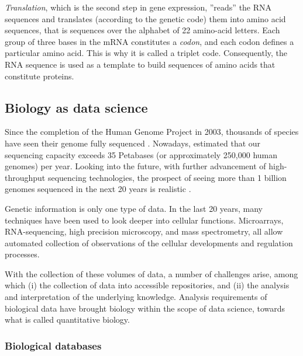 \emph{Translation}, which is the second step in gene expression, ''reads'' the RNA sequences and translates (according to the genetic code) them into amino acid sequences, that is sequences over the alphabet of 22 amino-acid letters.  Each group of three bases in the mRNA constitutes a  \emph{codon}, and each codon defines a particular amino acid. This is why it is called a triplet code. Consequently, the RNA sequence is used as a template to build sequences of amino acids that constitute proteins.



\subsection{Biology as data science}


Since the completion of the Human Genome Project in 2003, thousands of species have seen their genome fully sequenced \parencite{reddy2014genomes}.
Nowadays, \textcite{regalado2014emtech} estimated that our sequencing capacity exceeds 35 Petabases (or approximately 250,000 human genomes) per year.
Looking into the future, with further advancement of high-throughput sequencing technologies, the prospect of seeing more than 1 billion genomes sequenced in the next 20 years is  realistic \parencite{schatz2015biological}.

Genetic information is only one type of data.
In the last 20 years, many techniques have been used to look deeper into  cellular functions.
Microarrays, RNA-sequencing, high precision microscopy, and mass spectrometry, all allow automated collection of observations of the cellular developments and regulation processes.

With the collection of these volumes of data, a number of challenges arise, among which (i) the collection of data  into accessible repositories, and (ii) the analysis and interpretation of the underlying knowledge.
Analysis requirements of biological data have brought  biology within the scope of data science, towards what is called quantitative biology.

\subsubsection{Biological databases}


